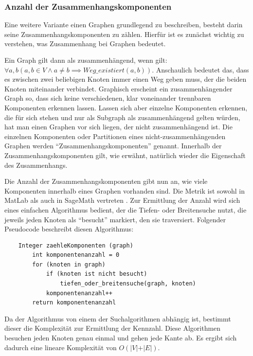 \documentclass[a4paper,12pt,ngerman,chapterprefix=false,listof=totoc,bibliography=totoc]{scrreprt}
\begin{document}
\subsubsection*{Anzahl der Zusammenhangskomponenten}
{
Eine weitere Variante einen Graphen grundlegend zu beschreiben, besteht darin seine Zusammenhangskomponenten zu zählen. Hierfür ist es zunächst wichtig zu verstehen, was Zusammenhang bei Graphen bedeutet.

Ein Graph gilt dann als zusammenhängend, wenn gilt: \(\forall a, b(a,b\in V \land a\neq b \implies Weg\_existiert(a, b))\). Anschaulich bedeutet das, dass es zwischen zwei beliebigen Knoten immer einen Weg geben muss, der die beiden Knoten miteinander verbindet. Graphisch erscheint ein zusammenhängender Graph so, dass sich keine verschiedenen, klar voneinander trennbaren Komponenten erkennen lassen. Lassen sich aber einzelne Komponenten erkennen, die für sich stehen und nur als Subgraph als zusammenhängend gelten würden, hat man einen Graphen vor sich liegen, der nicht zusammenhängend ist. Die einzelnen Komponenten oder Partitionen eines nicht-zusammenhängenden Graphen werden "`Zusammenhangskomponenten"' genannt. Innerhalb der Zusammenhangskomponenten gilt, wie erwähnt, natürlich wieder die Eigenschaft des Zusammenhangs. \cite{diestel_graphentheorie_2000}

Die Anzahl der Zusammenhangskomponenten gibt nun an, wie viele Komponenten innerhalb eines Graphen vorhanden sind. Die Metrik ist sowohl in MatLab als auch in SageMath vertreten \cite{sagemath_graph_2020,matlab_graph_2020}. Zur Ermittlung der Anzahl wird sich eines einfachen Algorithmus bedient, der die Tiefen- oder Breitensuche nutzt, die jeweils jeden Knoten als "`besucht"' markiert, den sie traversiert. Folgender Pseudocode beschreibt diesen Algorithmus:
\begin{lstlisting}
	Integer zaehleKomponenten (graph)
		int komponentenanzahl = 0
		for (knoten in graph)
			if (knoten ist nicht besucht)
				tiefen_oder_breitensuche(graph, knoten)
			komponentenanzahl++
		return komponentenanzahl
\end{lstlisting}
Da der Algorithmus von einem der Suchalgorithmen abhängig ist, bestimmt dieser die Komplexität zur Ermittlung der Kennzahl. Diese Algorithmen besuchen jeden Knoten genau einmal und gehen jede Kante ab. Es ergibt sich dadurch eine lineare Komplexität von \(O(\vert V\vert +\vert E\vert)\).
}
\end{document}
